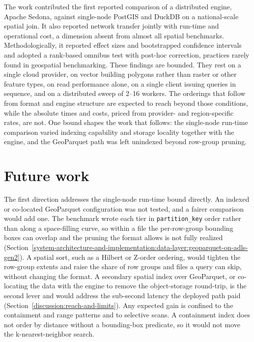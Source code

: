 The work contributed the first reported comparison of a distributed engine, Apache Sedona, against single-node PostGIS and DuckDB on a national-scale spatial join. It also reported network transfer jointly with run-time and operational cost, a dimension absent from almost all spatial benchmarks. Methodologically, it reported effect sizes and bootstrapped confidence intervals and adopted a rank-based omnibus test with post-hoc correction, practices rarely found in geospatial benchmarking. These findings are bounded. They rest on a single cloud provider, on vector building polygons rather than raster or other feature types, on read performance alone, on a single client issuing queries in sequence, and on a distributed sweep of 2--16 workers. The orderings that follow from format and engine structure are expected to reach beyond those conditions, while the absolute times and costs, priced from provider- and region-specific rates, are not. One bound shapes the work that follows: the single-node run-time comparison varied indexing capability and storage locality together with the engine, and the GeoParquet path was left unindexed beyond row-group pruning.

\section{Future work}
\label{conclusions:future-work}

The first direction addresses the single-node run-time bound directly. An indexed or co-located GeoParquet configuration was not tested, and a fairer comparison would add one. The benchmark wrote each tier in \texttt{partition\_key} order rather than along a space-filling curve, so within a file the per-row-group bounding boxes can overlap and the pruning the format allows is not fully realized (Section~\ref{system-architecture-and-implementation:data-layer:geoparquet-on-adls-gen2}). A spatial sort, such as a Hilbert or Z-order ordering, would tighten the row-group extents and raise the share of row groups and files a query can skip, without changing the format. A secondary spatial index over GeoParquet, or co-locating the data with the engine to remove the object-storage round-trip, is the second lever and would address the sub-second latency the deployed path paid (Section~\ref{discussion:reach-and-limits}). Any expected gain is confined to the containment and range patterns and to selective scans. A containment index does not order by distance without a bounding-box predicate, so it would not move the k-nearest-neighbor search.

